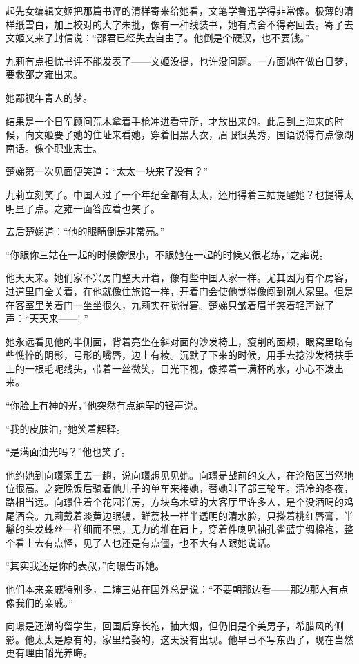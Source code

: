 \par 起先女编辑文姬把那篇书评的清样寄来给她看，文笔学鲁迅学得非常像。极薄的清样纸雪白，加上校对的大字朱批，像有一种线装书，她有点舍不得寄回去。寄了去文姬又来了封信说：“邵君已经失去自由了。他倒是个硬汉，也不要钱。”
\par 九莉有点担忧书评不能发表了——文姬没提，也许没问题。一方面她在做白日梦，要救邵之雍出来。
\par 她鄙视年青人的梦。
\par 结果是一个日军顾问荒木拿着手枪冲进看守所，才放出来的。此后到上海来的时候，向文姬要了她的住址来看她，穿着旧黑大衣，眉眼很英秀，国语说得有点像湖南话。像个职业志士。
\par 楚娣第一次见面便笑道：“太太一块来了没有？”
\par 九莉立刻笑了。中国人过了一个年纪全都有太太，还用得着三姑提醒她？也提得太明显了点。之雍一面答应着也笑了。
\par 去后楚娣道：“他的眼睛倒是非常亮。”
\par “你跟你三姑在一起的时候像很小，不跟她在一起的时候又很老练，”之雍说。
\par 他天天来。她们家不兴房门整天开着，像有些中国人家一样。尤其因为有个房客，过道里门全关着，在他就像住旅馆一样，开着门会使他觉得像闯到别人家里。但是在客室里关着门一坐坐很久，九莉实在觉得窘。楚娣只皱着眉半笑着轻声说了声：“天天来——! ”
\par 她永远看见他的半侧面，背着亮坐在斜对面的沙发椅上，瘦削的面颊，眼窝里略有些憔悴的阴影，弓形的嘴唇，边上有棱。沉默了下来的时候，用手去捻沙发椅扶手上的一根毛呢线头，带着一丝微笑，目光下视，像捧着一满杯的水，小心不泼出来。
\par “你脸上有神的光，”他突然有点纳罕的轻声说。
\par “我的皮肤油，”她笑着解释。
\par “是满面油光吗？”他也笑了。
\par 他约她到向璟家里去一趟，说向璟想见见她。向璟是战前的文人，在沦陷区当然地位很高。之雍晚饭后骑着他儿子的单车来接她，替她叫了部三轮车。清冷的冬夜，路相当远。向璟住着个花园洋房，方块乌木壁的大客厅里许多人，是个没酒喝的鸡尾酒会。九莉戴着淡黄边眼镜，鲜荔枝一样半透明的清水脸，只搽着桃红唇膏，半鬈的头发蛛丝一样细而不黑，无力的堆在肩上，穿着件喇叭袖孔雀蓝宁绸棉袍，整个看上去有点怪，见了人也还是有点僵，也不大有人跟她说话。
\par “其实我还是你的表叔，”向璟告诉她。
\par 他们本来亲戚特别多，二婶三姑在国外总是说：“不要朝那边看——那边那人有点像我们的亲戚。”
\par 向璟是还潮的留学生，回国后穿长袍，抽大烟，但仍旧是个美男子，希腊风的侧影。他太太是原有的，家里给娶的，这天没有出现。他早已不写东西了，现在当然更有理由韬光养晦。
